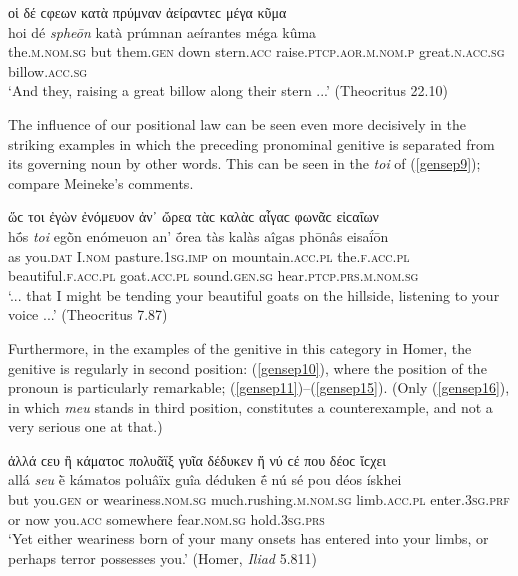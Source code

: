 \begin{exe}
\ex οἱ δέ ϲφεων κατὰ πρύμναν ἀείραντεϲ μέγα κῦμα\\
\gll hoi dé \emph{spheōn} katà prúmnan aeírantes méga kûma\\
the.\textsc{m.nom.sg} but them.\textsc{gen} down stern.\textsc{acc}
raise.\textsc{ptcp.aor.m.nom.p} great.\textsc{n.acc.sg} billow.\textsc{acc.sg}\\
\trans `And they, raising a great billow along their stern ...' (Theocritus 22.10)
\label{gen26}
\end{exe}

The influence of our positional law can be seen even more decisively in the striking examples in which the preceding pronominal genitive is separated from its governing noun by other words. This can be seen in the \textit{toi} of (\ref{gensep9}); compare Meineke's \citeyearpar[256]{Meineke1856} comments.

\begin{exe}
\ex ὥϲ τοι ἐγὼν ἐνόμευον ἀν᾽ ὤρεα τὰϲ καλὰϲ αἶγαϲ φωνᾶϲ εἰϲαΐων\\
\gll hṓs \emph{toi} egṑn enómeuon an' ṓrea tàs kalàs aîgas phōnâs eisaḯōn\\
as you.\textsc{dat} I.\textsc{nom} pasture.\textsc{1sg.imp} on mountain.\textsc{acc.pl} the.\textsc{f.acc.pl} beautiful.\textsc{f.acc.pl} goat.\textsc{acc.pl} sound.\textsc{gen.sg} hear.\textsc{ptcp.prs.m.nom.sg}\\
\trans `... that I might be tending your beautiful goats on the hillside, listening to your voice ...' (Theocritus 7.87)
\label{gensep9}
\end{exe}

Furthermore, in the examples of the genitive in this category in Homer, the genitive is regularly in second position: (\ref{gensep10}), where the position of the pronoun is particularly remarkable; (\ref{gensep11})--(\ref{gensep15}). (Only (\ref{gensep16}), in which \textit{meu} stands in third position, constitutes a counterexample, and not a very serious one at that.)

\begin{exe}
\ex ἀλλά ϲευ ἢ κάματοϲ πολυᾶϊξ γυῖα δέδυκεν ἤ νύ ϲέ που δέοϲ ἴϲχει\\
\gll allá \emph{seu} ḕ kámatos poluâïx guîa déduken ḗ nú sé pou déos ískhei\\
but you.\textsc{gen} or weariness.\textsc{nom.sg} much.rushing.\textsc{m.nom.sg} limb.\textsc{acc.pl} enter.\textsc{3sg.prf} or now you.\textsc{acc} somewhere
fear.\textsc{nom.sg} hold.\textsc{3sg.prs}\\
\trans `Yet either weariness born of your many onsets has entered into your limbs, or perhaps terror possesses you.' (Homer, \textit{Iliad} 5.811)
\label{gensep10}
\end{exe}

